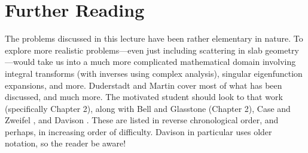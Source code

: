 \section*{Further Reading}

The problems discussed in this lecture have been rather elementary in nature.  To explore more realistic problems---even just including scattering in slab geometry---would take us into a much more complicated mathematical domain involving integral transforms (with inverses using complex analysis), singular eigenfunction expansions, and more.  Duderstadt and Martin \cite{duderstadt1976tt} cover most of what has been discussed, and much more.  The motivated student should look to that work (specifically Chapter 2), along with Bell and Glasstone (Chapter 2), Case and Zweifel \cite{case1967ltt}, and Davison \cite{davison1957ntt}.  These are listed in reverse chronological order, and perhaps, in increasing order of difficulty.  Davison in particular uses older notation, so the reader be aware!

